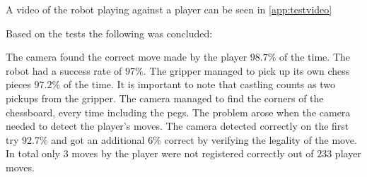 A video of the robot playing against a player can be seen in \cref{app:testvideo}

Based on the tests the following was concluded:

The camera found the correct move made by the player $98.7\%$ of the time. The robot had a success rate of $97\%$. The gripper managed to pick up its own chess pieces $97.2\%$ of the time. It is important to note that castling counts as two pickups from the gripper. The camera managed to find the corners of the chessboard, every time including the pegs. The problem arose when the camera needed to detect the player's moves. The camera detected correctly on the first try $92.7\%$ and got an additional $6\%$ correct by verifying the legality of the move. In total only $3$ moves by the player were not registered correctly out of $233$ player moves.